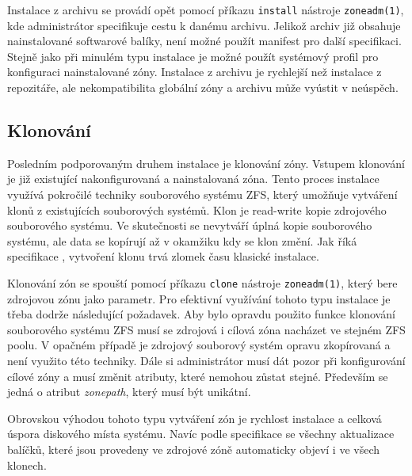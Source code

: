 Instalace z archivu se provádí opět pomocí příkazu \verb|install| nástroje \verb|zoneadm(1)|, kde administrátor specifikuje
cestu k danému archivu. Jelikož archiv již obsahuje nainstalované softwarové balíky, není možné použít manifest pro další specifikaci.
Stejně jako při minulém typu instalace je možné použít systémový profil pro konfiguraci nainstalované zóny. Instalace z 
archivu je rychlejší než instalace z repozitáře, ale nekompatibilita globální zóny a archivu může vyústit v neúspěch.
\subsection{Klonování}
\label{chapter:zones:instalation:cloning}
Posledním podporovaným druhem instalace je klonování zóny. Vstupem klonování je již existující nakonfigurovaná a nainstalovaná
zóna. Tento proces instalace využívá pokročilé techniky souborového systému ZFS, který umožňuje vytváření klonů z existujících
souborových systémů. Klon je read-write kopie zdrojového souborového systému. Ve skutečnosti se nevytváří úplná kopie
souborového systému, ale data se kopírují až v okamžiku kdy se klon změní. Jak říká specifikace \cite{oracle:solaris:zones:clonning},
vytvoření klonu trvá zlomek času klasické instalace. 

Klonování zón se spouští pomocí příkazu \verb|clone| nástroje \verb|zoneadm(1)|, který bere zdrojovou zónu jako parametr. Pro efektivní
využívání tohoto typu instalace je třeba dodrže následující požadavek. Aby bylo opravdu použito funkce klonování souborového systému
ZFS musí se zdrojová i cílová zóna nacházet ve stejném ZFS poolu. V opačném případě je zdrojový souborový systém opravu zkopírovaná a
není využito této techniky. Dále si administrátor musí dát pozor při konfigurování cílové zóny a musí změnit atributy, které
nemohou zůstat stejné. Především se jedná o atribut \textit{zonepath}, který musí být unikátní.

Obrovskou výhodou tohoto typu vytváření zón je rychlost instalace a celková úspora diskového místa systému. Navíc podle specifikace
\cite{oracle:solaris:zones:clonning} se všechny aktualizace balíčků, které jsou provedeny ve zdrojové zóně automaticky objeví i ve
všech klonech.
